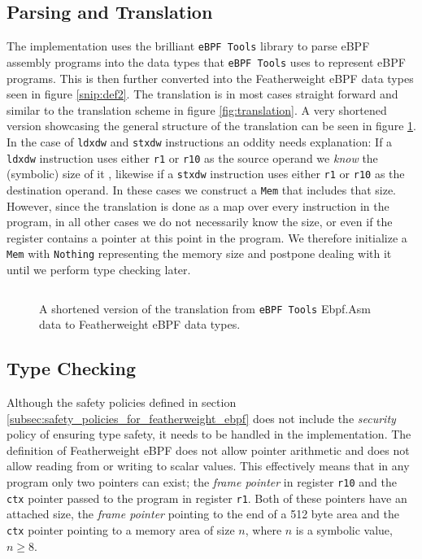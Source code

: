 \subsection{Parsing and Translation}
\label{subsec:parsing_and_translation}
The implementation uses the brilliant \texttt{eBPF Tools}\cite{ebpf-tools} library to parse eBPF assembly programs into the data types that \texttt{eBPF Tools} uses to represent eBPF programs.
This is then further converted into the Featherweight eBPF data types seen in figure \ref{snip:def2}.
The translation is in most cases straight forward and similar to the translation scheme in figure \ref{fig:translation}. A very shortened version showcasing the general structure of the translation can be seen in figure \ref{snip:toFWProg}. In the case of \texttt{ldxdw} and \texttt{stxdw} instructions an oddity needs explanation: If a \texttt{ldxdw} instruction uses either \texttt{r1} or \texttt{r10} as the source operand we \textit{know} the (symbolic) size of it , likewise if a \texttt{stxdw} instruction uses either \texttt{r1} or \texttt{r10} as the destination operand. In these cases we construct a \texttt{Mem} that includes that size.
However, since the translation is done as a map over every instruction in the program, in all other cases we do not necessarily know the size, or even if the register contains a pointer at this point in the program. We therefore initialize a \texttt{Mem} with \texttt{Nothing} representing the memory size and postpone dealing with it until we perform type checking later. 

\begin{figure}[ht]
  \centering
\inputminted[linenos]{haskell}{snippets/toFWProg.hs}
  \caption{A shortened version of the translation from \texttt{eBPF Tools} Ebpf.Asm data to Featherweight eBPF data types. }
  \label{snip:toFWProg}
\end{figure}



\subsection{Type Checking}
\label{subsec:type_checking}
Although the safety policies defined in section \ref{subsec:safety_policies_for_featherweight_ebpf} does not include the \textit{security} policy of ensuring type safety, it needs to be handled in the implementation. The definition of Featherweight eBPF does not allow pointer arithmetic and does not allow reading from or writing to scalar values. This effectively means that in any program only two pointers can exist; the \textit{frame pointer} in register \texttt{r10} and the \texttt{ctx} pointer passed to the program in register \texttt{r1}. Both of these pointers have an attached size, the \textit{frame pointer} pointing to the end of a 512 byte area and the \texttt{ctx} pointer pointing to a memory area of size $n$, where $n$ is a symbolic value, $n \geq 8$.

